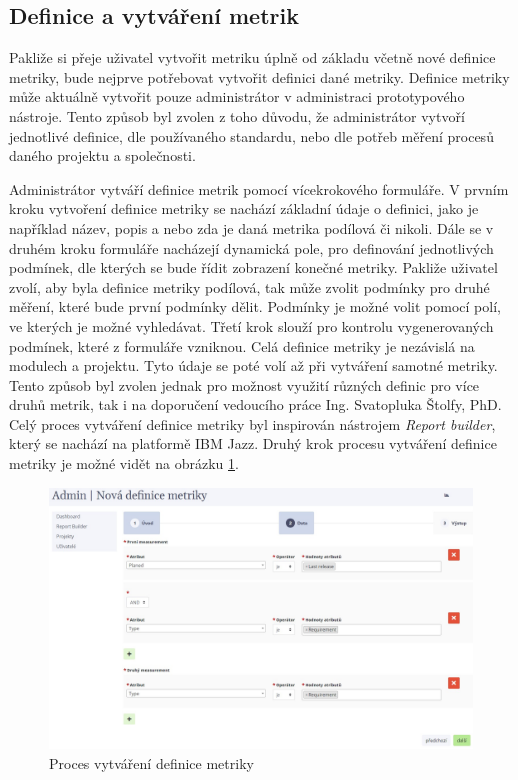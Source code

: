 \documentclass[czech,master,public,dept460,male,cpdeclaration,oneside]{diploma}
\begin{document}

\subsection{Definice a vytváření metrik}
Pakliže si přeje uživatel vytvořit metriku úplně od základu včetně nové definice metriky, bude nejprve potřebovat vytvořit definici dané metriky. Definice metriky může aktuálně vytvořit pouze administrátor v administraci prototypového nástroje. Tento způsob byl zvolen z toho důvodu, že administrátor vytvoří jednotlivé definice, dle používaného standardu, nebo dle potřeb měření procesů daného projektu a společnosti.

Administrátor vytváří definice metrik pomocí vícekrokového formuláře. V prvním kroku vytvoření definice metriky se nachází základní údaje o definici, jako je například název, popis a nebo zda je daná metrika podílová či nikoli. Dále se v druhém kroku formuláře nacházejí dynamická pole, pro definování jednotlivých podmínek, dle kterých se bude řídit zobrazení konečné metriky. Pakliže uživatel zvolí, aby byla definice metriky podílová, tak může zvolit podmínky pro druhé měření, které bude první podmínky dělit. Podmínky je možné volit pomocí polí, ve kterých je možné vyhledávat. Třetí krok slouží pro kontrolu vygenerovaných podmínek, které z formuláře vzniknou. Celá definice metriky je nezávislá na modulech a projektu. Tyto údaje se poté volí až při vytváření samotné metriky. Tento způsob byl zvolen jednak pro možnost využití různých definic pro více druhů metrik, tak i na doporučení vedoucího práce Ing. Svatopluka Štolfy, PhD. Celý proces vytváření definice metriky byl inspirován nástrojem \textit{Report builder}, který se nachází na platformě IBM Jazz. Druhý krok procesu vytváření definice metriky je možné vidět na obrázku \ref{fig:report_builder_admin}. 

\begin{figure}[!ht]
    \centering
    \includegraphics[width=1\textwidth]{Diplomka/Figures/report_builder.jpg}
    \caption{Proces vytváření definice metriky}
    \label{fig:report_builder_admin}
\end{figure}
\end{document}
